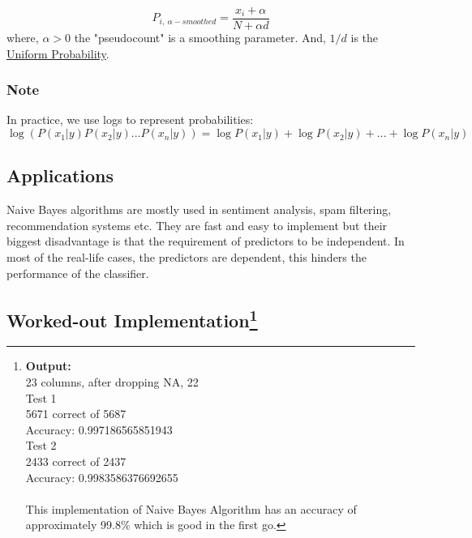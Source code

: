     \begin{equation}
        P_{i,\ \alpha-smoothed} = \frac{x_i+\alpha}{N+\alpha d}
    \end{equation}
    where, $\alpha > 0$ the "pseudocount" is a smoothing parameter. And, $1/d$ is the \href{https://en.wikipedia.org/wiki/Discrete_uniform_distribution}{Uniform Probability}.

    \subsubsection*{Note}
    In practice, we use logs to represent probabilities:
    \begin{equation}
        \log{(P(x_1|y)P(x_2|y)...P(x_n|y))} = \log{P(x_1|y)} + \log{P(x_2|y)} +...+ \log{P(x_n|y)}
    \end{equation}


\subsection*{Applications}
    Naive Bayes algorithms are mostly used in sentiment analysis, spam filtering, recommendation systems etc. They are fast and easy to implement but their biggest disadvantage is that the requirement of predictors to be independent. In most of the real-life cases, the predictors are dependent, this hinders the performance of the classifier.

\subsection*{Worked-out Implementation\footnote[2]{ \textbf{Output:}\\
23 columns, after dropping NA, 22\\
Test 1\\
5671 correct of 5687\\
Accuracy: 0.997186565851943\\
Test 2\\
2433 correct of 2437\\
Accuracy: 0.9983586376692655\\ 
\\This implementation of Naive Bayes Algorithm has an accuracy of approximately 99.8\% which is good in the first go.}}

